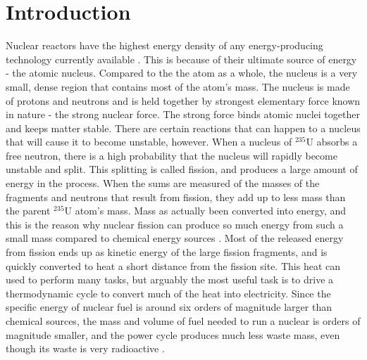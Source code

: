 \chapter{Introduction}

Nuclear reactors have the highest energy density of any energy-producing technology currently available \cite{energy_density}.  This is because of their ultimate source of energy - the atomic nucleus.  Compared to the the atom as a whole, the nucleus is a very small, dense region that contains most of the atom's mass.  The nucleus is made of protons and neutrons and is held together by strongest elementary force known in nature - the strong nuclear force. The strong force binds atomic nuclei together and keeps matter stable.  There are certain reactions that can happen to a nucleus that will cause it to become unstable, however.  When a nucleus of $^{235}$U absorbs a free neutron, there is a high probability that the nucleus will rapidly become unstable and split.  This splitting is called fission, and produces a large amount of energy in the process.  When the sums are measured of the masses of the fragments and neutrons that result from fission, they add up to less mass than the parent $^{235}$U atom's mass.  Mass as actually been converted into energy, and this is the reason why nuclear fission can produce so much energy from such a small mass compared to chemical energy sources \cite{krane, duderstadt}.   Most of the released energy from fission ends up as kinetic energy of the large fission fragments, and is quickly converted to heat a short distance from the fission site.  This heat can used to perform many tasks, but arguably the most useful task is to drive a thermodynamic cycle to convert much of the heat into electricity.  Since the specific energy of nuclear fuel is around six orders of magnitude larger than chemical sources, the mass and volume of fuel needed to run a nuclear is orders of magnitude smaller, and the power cycle produces much less waste mass, even though its waste is very radioactive \cite{waste_mass}.  

